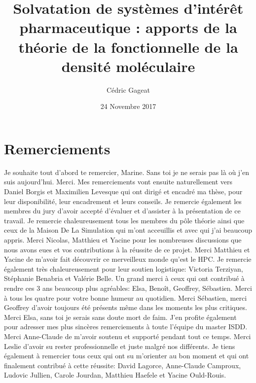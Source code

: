 \documentclass{bredele}
\title{Solvatation de systèmes d’intérêt pharmaceutique : apports de la théorie de la fonctionnelle de la densité moléculaire}
\author{Cédric Gageat}
\institute{l'\'Ecole Normale Supérieure}
\date{24 Novembre 2017}
\begin{document}
\frontmatter

\tikzexternaldisable
\maketitle{}
\tikzexternalenable

\cleardoublepage

\chapter*{Remerciements}


Je souhaite tout d'abord te remercier, Marine. Sans toi je ne serais pas là o\`u j'en suis aujourd'hui. Merci.
\medbreak
Mes remerciements vont ensuite naturellement vers Daniel Borgis et Maximilien Levesque qui ont dirigé et encadré ma thèse, pour leur disponibilité, leur encadrement et leurs conseils.
\medbreak
Je remercie également les membres du jury d’avoir accepté d'évaluer et d’assister à la présentation de ce travail.
\medbreak
Je remercie chaleureusement tous les membres du pôle théorie ainsi que ceux de la Maison De La Simulation qui m'ont acceuillis et avec qui j'ai beaucoup appris. Merci Nicolas, Matthieu et Yacine pour les nombreuses discussions que nous avons eues et vos contributions à la réussite de ce projet. Merci Matthieu et Yacine de m'avoir fait découvrir ce merveilleux monde qu'est le HPC. Je remercie également très chaleureusement pour leur soutien logistique: Victoria Terziyan, Stéphanie Benabria et Valérie Belle.
\medbreak
Un grand merci à ceux qui ont contribué à rendre ces 3 ans beaucoup plus agréables: Elsa, Beno\^it, Geoffrey, Sébastien. Merci à tous les quatre pour votre bonne humeur au quotidien. Merci Sébastien, merci Geoffrey d'avoir toujours été présents même dans les moments les plus critiques. Merci Elsa, sans toi je serais sans doute mort de faim.
\medbreak
J'en profite également pour adresser mes plus sincères remerciements à toute l'équipe du master ISDD. Merci Anne-Claude de m'avoir soutenu et supporté pendant tout ce temps. Merci Leslie d'avoir su rester professionnelle et juste malgré nos différents.
\medbreak
Je tiens également à remercier tous ceux qui ont su m'orienter au bon moment et qui ont finalement contribué à cette réussite: David Lagorce, Anne-Claude Camproux, Ludovic Jullien, Carole Jourdan, Matthieu Haefele et Yacine Ould-Rouis.



\clearemptydoublepage



\renewcommand\contentsname{Sommaire}
\tableofcontents
 
\end{document}
